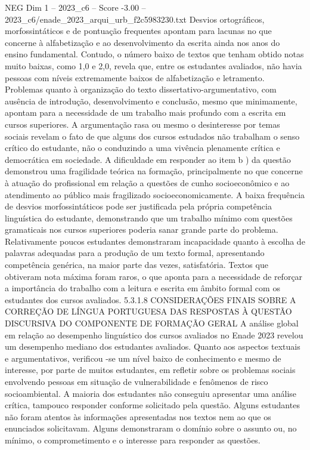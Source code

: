 \begin{textsample}{NEG Dim 1 – 2023\_c6 – Score -3.00 – 2023\_c6/enade\_2023\_arqui\_urb\_f2c5983230.txt}
Desvios ortográficos, morfossintáticos e de pontuação frequentes apontam para lacunas no que concerne à alfabetização e ao desenvolvimento da escrita ainda nos anos do ensino fundamental.
Contudo, o número baixo de textos que tenham obtido notas muito baixas, como 1,0 e 2,0, revela que, entre os estudantes avaliados, não havia pessoas com níveis extremamente baixos de alfabetização e letramento.
Problemas quanto à organização do texto dissertativo-argumentativo, com ausência de introdução, desenvolvimento e conclusão, mesmo que minimamente, apontam para a necessidade de um trabalho mais profundo com a escrita em cursos superiores.
A argumentação rasa ou mesmo o desinteresse por temas sociais revelam o fato de que alguns dos cursos estudados não trabalham o senso crítico do estudante, não o conduzindo a uma vivência plenamente crítica e democrática em sociedade.
A dificuldade em responder ao item b ) da questão demonstrou uma fragilidade teórica na formação, principalmente no que concerne à atuação do profissional em relação a questões de cunho socioeconômico e ao atendimento ao público mais fragilizado socioeconomicamente.
A baixa frequência de desvios morfossintáticos pode ser justificada pela própria competência linguística do estudante, demonstrando que um trabalho mínimo com questões gramaticais nos cursos superiores poderia sanar grande parte do problema.
Relativamente poucos estudantes demonstraram incapacidade quanto à escolha de palavras adequadas para a produção de um texto formal, apresentando competência genérica, na maior parte das vezes, satisfatória.
Textos que obtiveram nota máxima foram raros, o que aponta para a necessidade de reforçar a importância do trabalho com a leitura e escrita em âmbito formal com os estudantes dos cursos avaliados. 5.3.1.8 CONSIDERAÇÕES FINAIS SOBRE A CORREÇÃO DE LÍNGUA PORTUGUESA DAS RESPOSTAS À QUESTÃO DISCURSIVA DO COMPONENTE DE FORMAÇÃO GERAL A análise global em relação ao desempenho linguístico dos cursos avaliados no Enade 2023 revelou um desempenho mediano dos estudantes avaliados.
Quanto aos aspectos textuais e argumentativos, verificou -se um nível baixo de conhecimento e mesmo de interesse, por parte de muitos estudantes, em refletir sobre os problemas sociais envolvendo pessoas em situação de vulnerabilidade e fenômenos de risco socioambiental.
A maioria dos estudantes não conseguiu apresentar uma análise crítica, tampouco responder conforme solicitado pela questão.
Alguns estudantes não foram atentos às informações apresentadas nos textos nem ao que os enunciados solicitavam.
Alguns demonstraram o domínio sobre o assunto ou, no mínimo, o comprometimento e o interesse para responder as questões.

\end{textsample}
